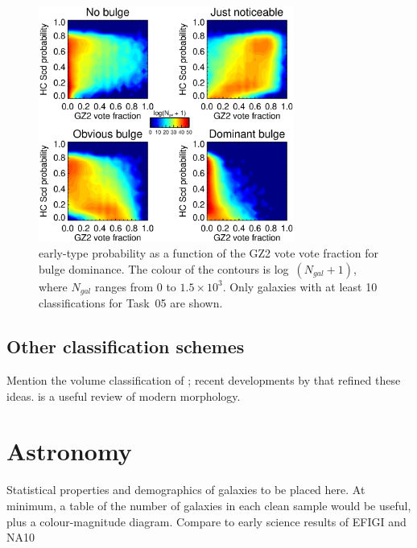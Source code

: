 \documentclass[useAMS,usenatbib]{mn2e}
\begin{document}
\begin{figure}
\includegraphics[angle=0,width=3.3in]{figures/hc_gz2_bulge_contour.eps}
\caption{\citet{hue11} early-type probability as a function of the GZ2 vote vote fraction for bulge dominance. The colour of the contours is log~$(N_{gal} + 1)$, where $N_{gal}$ ranges from 0 to $1.5\times10^3$. Only galaxies with at least 10 classifications for Task~05 are shown.   
\label{fig-hc_gz2_bulge_contour}}
\end{figure}

\subsection{Other classification schemes}

Mention the volume classification of \citet{dev59}; recent developments by \citet{kor12,lau11,cap11,kra11} that refined these ideas. \citet{but11} is a useful review of modern morphology. 


\section{Astronomy}\label{sec-astronomy}

Statistical properties and demographics of galaxies to be placed here. At minimum, a table of the number of galaxies in each clean sample would be useful, plus a colour-magnitude diagram. Compare to early science results of EFIGI \citep{del11a} and NA10 \citep{nai10a,nai10b}

\end{document}
